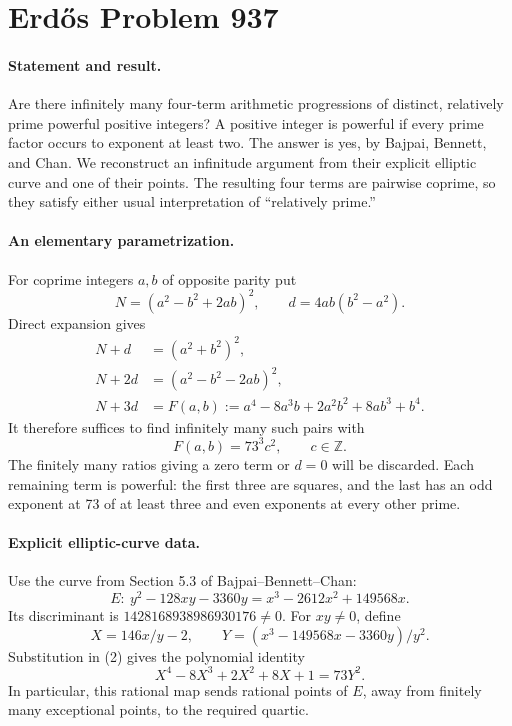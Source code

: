 \section*{Erd\H{o}s Problem 937}

\paragraph{Statement and result.}
Are there infinitely many four-term arithmetic progressions of distinct, relatively prime powerful positive integers? A positive integer is powerful if every prime factor occurs to exponent at least two. The answer is yes, by Bajpai, Bennett, and Chan. We reconstruct an infinitude argument from their explicit elliptic curve and one of their points. The resulting four terms are pairwise coprime, so they satisfy either usual interpretation of ``relatively prime.''

\paragraph{An elementary parametrization.}
For coprime integers \(a,b\) of opposite parity put
\[
 N=(a^2-b^2+2ab)^2,\qquad d=4ab(b^2-a^2).
\]
Direct expansion gives
\begin{align*}
 N+d&=(a^2+b^2)^2,\\
 N+2d&=(a^2-b^2-2ab)^2,\\
 N+3d&=F(a,b):=a^4-8a^3b+2a^2b^2+8ab^3+b^4.
\end{align*}
It therefore suffices to find infinitely many such pairs with
\[
 F(a,b)=73^3c^2,\qquad c\in\mathbb Z. \tag{1}
\]
The finitely many ratios giving a zero term or \(d=0\) will be discarded. Each remaining term is powerful: the first three are squares, and the last has an odd exponent at 73 of at least three and even exponents at every other prime.

\paragraph{Explicit elliptic-curve data.}
Use the curve from Section 5.3 of Bajpai--Bennett--Chan:
\[
 E:\ y^2-128xy-3360y=x^3-2612x^2+149568x. \tag{2}
\]
Its discriminant is \(1428168938986930176\ne0\). For \(xy\ne0\), define
\[
 X=146x/y-2,\qquad Y=(x^3-149568x-3360y)/y^2.
\]
Substitution in (2) gives the polynomial identity
\[
 X^4-8X^3+2X^2+8X+1=73Y^2. \tag{3}
\]
In particular, this rational map sends rational points of \(E\), away from finitely many exceptional points, to the required quartic.

